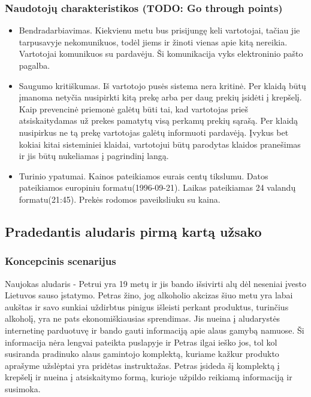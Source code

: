 \documentclass[oneside]{VUMIFPSkursinis}
\begin{document}
		\subsubsection{Naudotojų charakteristikos (TODO: Go through points)}
			\begin{itemize}
				\item{Bendradarbiavimas.}
					Kiekvienu metu bus prisijungę keli vartotojai, tačiau jie tarpusavyje nekomunikuos, todėl jiems ir žinoti vienas apie kitą nereikia.
					Vartotojai komunikuos su pardavėju.
					Ši komunikacija vyks elektroninio pašto pagalba.
				\item{Saugumo kritiškumas.}
					Iš vartotojo pusės sistema nera kritinė.
					Per klaidą būtų įmanoma netyčia nusipirkti kitą prekę arba per daug prekių įsidėti į krepšelį.
					Kaip prevencinė priemonė galėtų būti tai, kad vartotojas prieš atsiskaitydamas už prekes pamatytų visą perkamų prekių sąrašą.
					Per klaidą nusipirkus ne tą prekę vartotojas galėtų informuoti pardavėją.
					Įvykus bet kokiai kitai sisteminiei klaidai, vartotojui būtų parodytas klaidos pranešimas ir jis būtų nukeliamas į pagrindinį langą.
				\item{Turinio ypatumai.}
					Kainos pateikiamos eurais centų tikslumu.
					Datos pateikiamos europiniu formatu(1996-09-21).
					Laikas pateikiamas 24 valandų formatu(21:45).
					Prekės rodomos paveiksliuku su kaina.
			\end{itemize}
	\subsection{Pradedantis aludaris pirmą kartą užsako}
		\subsubsection{Koncepcinis scenarijus}
			Naujokas aludaris - Petrui yra 19 metų ir jis bando išsivirti alų dėl neseniai įvesto Lietuvos sauso įstatymo.
			Petras žino, jog alkoholio akcizas šiuo metu yra labai aukštas ir savo sunkiai uždirbtus pinigus išleisti perkant produktus, turinčius alkoholį, yra ne pats ekonomiškiausias sprendimas.
			Jis nueina į aludarystės internetinę parduotuvę ir bando gauti informaciją apie alaus gamybą namuose.
			Ši informacija nėra lengvai pateikta puslapyje ir Petras ilgai ieško jos, tol kol susiranda pradinuko alaus gamintojo komplektą, kuriame kažkur produkto aprašyme užslėptai yra pridėtas instruktažas.
			Petras įsideda šį komplektą į krepšelį ir nueina į atsiskaitymo formą, kurioje užpildo reikiamą informaciją ir susimoka.
\end{document}
